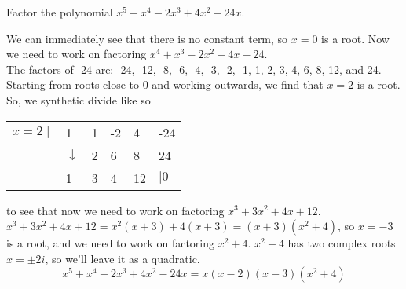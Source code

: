 \begin{example}
Factor the polynomial $x^5 + x^4 -2x^3 + 4x^2 -24x$.	
\end{example}
\noindent
We can immediately see that there is no constant term, so $x=0$ is a root. Now we need to work on factoring $x^4 + x^3 -2x^2 + 4x - 24$.\\
The factors of -24 are: -24, -12, -8, -6, -4, -3, -2, -1, 1, 2, 3, 4, 6, 8, 12, and 24. Starting from roots close to 0 and working outwards, we find that $x=2$ is a root. So, we synthetic divide like so
\begin{table}[H]
	\centering
	\begin{tabular}{llllll}
		$x=2 \mid$ & 1            & 1 & -2 & 4  & -24 \\
		& $\downarrow$ & 2 & 6  & 8  & 24  \\ \hline
		& 1            & 3 & 4  & 12 & $\mid 0$  
	\end{tabular}
\end{table}
\noindent
to see that now we need to work on factoring $x^3+3x^2+4x+12$.
$x^3+3x^2+4x+12 = x^2(x+3)+4(x+3) = (x+3)(x^2+4)$, so $x=-3$ is a root, and we need to work on factoring $x^2+4$.
$x^2+4$ has two complex roots $x = \pm 2i$, so we'll leave it as a quadratic.
\begin{equation*}	
	x^5 + x^4 -2x^3 + 4x^2 -24x = x(x-2)(x-3)(x^2+4)
\end{equation*}